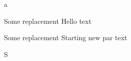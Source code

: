 
\def\month #1postfix{Some replacement #1 text}
a
\let\parr=\par

\def\par{A}

\month Hello postfix

\month Starting new par postfix

S

\let\par=\parr

\bye